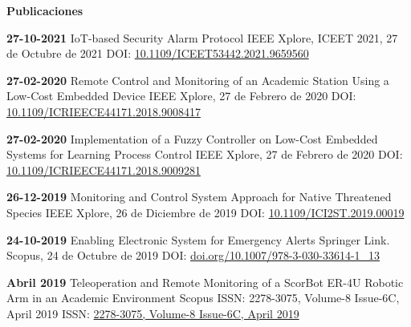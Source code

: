 \pagestyle{empty}
\begin{mainbar}
    \textbf{Publicaciones}
\end{mainbar}





\begin{levent}
    \cvevent
	{\textbf{27-10-2021}}
	{IoT-based Security Alarm Protocol}
	{IEEE Xplore, ICEET 2021, 27 de Octubre de 2021}
	{DOI: \href{https://ieeexplore.ieee.org/document/9659560}{10.1109/ICEET53442.2021.9659560} }
	{}
\end{levent}
\begin{devent}
    \cvevent
	{\textbf{27-02-2020}}
	{Remote Control and Monitoring of an Academic Station Using a Low-Cost Embedded Device}
	{IEEE Xplore, 27 de Febrero de 2020}
	{DOI: \href{https://ieeexplore.ieee.org/document/9008417}{10.1109/ICRIEECE44171.2018.9008417}}
	{}
\end{devent}
\begin{levent}
    \cvevent
	{\textbf{27-02-2020}}
	{Implementation of a Fuzzy Controller on Low-Cost Embedded 
Systems for Learning Process Control}
	{IEEE Xplore, 27 de Febrero de 2020}
	{DOI: \href{https://ieeexplore.ieee.org/document/9009281}{10.1109/ICRIEECE44171.2018.9009281}}
	{}
\end{levent}
\begin{devent}
    \cvevent
	{\textbf{26-12-2019}}
	{Monitoring and Control System Approach for Native Threatened Species}
	{IEEE Xplore, 26 de Diciembre de 2019}
	{DOI: \href{https://ieeexplore.ieee.org/document/8940400}{10.1109/ICI2ST.2019.00019}}
	{}
\end{devent}
\begin{levent}
    \cvevent
	{\textbf{24-10-2019}}
	{Enabling Electronic System for Emergency Alerts}
	{Springer Link. Scopus, 24 de Octubre de 2019}
	{DOI: \href{https://link.springer.com/chapter/10.1007/978-3-030-33614-1\_13}{doi.org/10.1007/978-3-030-33614-1\_13}}
	{}
\end{levent}

\begin{devent}
    \cvevent
	{\textbf{Abril 2019}}
	{Teleoperation and Remote Monitoring of a ScorBot ER-4U Robotic Arm in an Academic Environment}
	{Scopus ISSN: 2278-3075, Volume-8 Issue-6C, April 2019}
	{ISSN: \href{https://www.ijitee.org/wp-content/uploads/papers/v8i6c/F12170486C19.pdf}{2278-3075, Volume-8 Issue-6C, April 2019}}
	{}
\end{devent}


\newpage
\setlength{\headheight}{15pt}
\pagestyle{fancy}
\fancyhf{}
\rhead[Ponencias]{\rightmark}
\lfoot[\thepage]{}
\rfoot[]{\thepage}

